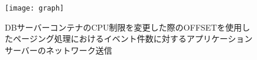 \documentclass[../../../../../main]{subfiles}
\begin{document}
    \begin{figure}[H]
        \centering
        \texttt{[image: graph]}
        \caption{DBサーバーコンテナのCPU制限を変更した際のOFFSETを使用したページング処理におけるイベント件数に対するアプリケーションサーバーのネットワーク送信}
        \label{fig:paging-offset-change-db-cpu-limit-app-net-out-app_4_8192-db_1024}
    \end{figure}
\end{document}
